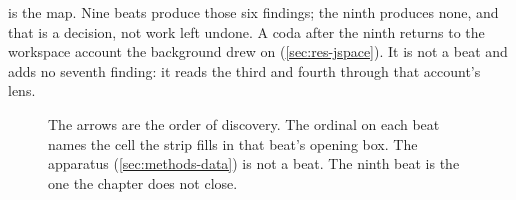 \noindent
{} is the map. Nine beats produce those six findings; the ninth
produces none, and that is a decision, not work left undone. A coda after the
ninth returns to the workspace account the background drew on
(\cref{sec:res-jspace}). It is not a beat and adds no seventh finding: it reads
the third and fourth through that account's lens.

\begin{figure}[htbp]
\begin{fullwidth}\raggedright

\caption[The investigation in nine beats]{ The arrows are the order of
discovery. The ordinal on each beat names the cell the strip fills in that
beat's opening box. The apparatus (\cref{sec:methods-data}) is not a beat. The ninth beat is the one the
chapter does not close.}
\label{fig:timeline}
\end{fullwidth}
\end{figure}

\clearpage





